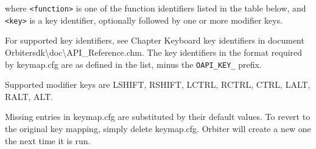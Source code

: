 \documentclass[Orbiter User Manual.tex]{subfiles}
\begin{document}
where \texttt{<function>} is one of the function identifiers listed in the table
below, and \texttt{<key>} is a key identifier, optionally followed by one or
more modifier keys.
\begin{sloppypar}%
For supported key identifiers, see Chapter Keyboard key identifiers in document
Orbitersdk\textbackslash doc\textbackslash API\_Reference.chm. The key
identifiers in the format required by keymap.cfg are as defined in the list,
minus the \texttt{OAPI\_KEY\_} prefix.
\end{sloppypar}

Supported modifier keys are LSHIFT, RSHIFT, LCTRL, RCTRL, CTRL, LALT, RALT, ALT.

Missing entries in keymap.cfg are substituted by their default values. To revert
to the original key mapping, simply delete keymap.cfg. Orbiter will create a new
one the next time it is run.
\end{document}
